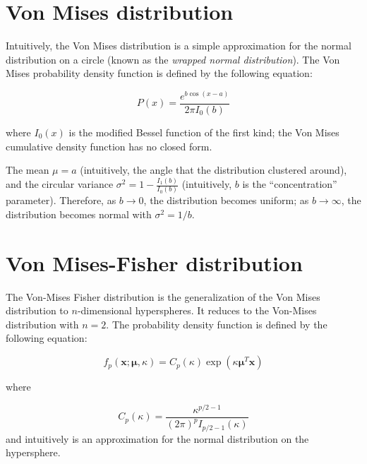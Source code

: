 \documentclass[../tech_report_1.tex]{subfiles}
\begin{document}
\section*{Von Mises distribution}

Intuitively, the Von Mises distribution \cite{wolfram_von_mises} is
a simple approximation for the normal distribution on a circle (known
as the \textit{wrapped normal distribution}). The Von Mises probability
density function is defined by the following equation:

\[
P(x)=\frac{{e^{b\cos(x-a)}}}{2\pi I_{0}(b)}
\]


where $I_{0}(x)$ is the modified Bessel function of the first kind;
the Von Mises cumulative density function has no closed form.

The mean $\mu=a$ (intuitively, the angle that the distribution clustered
around), and the circular variance $\sigma^{2}=1-\frac{{I_{1}(b)}}{I_{0}(b)}$
(intuitively, $b$ is the ``concentration'' parameter). Therefore,
as $b\rightarrow0$, the distribution becomes uniform; as $b\rightarrow\infty$,
the distribution becomes normal with $\sigma^{2}=1/b$.


\section*{Von Mises-Fisher distribution}

The Von-Mises Fisher distribution is the generalization of the Von
Mises distribution to $n$-dimensional hyperspheres. It reduces to
the Von-Mises distribution with $n=2$. The probability density function
is defined by the following equation:

\[
f_{p}(\boldsymbol{x};\boldsymbol{\mu},\kappa)=C_{p}(\kappa)\exp(\kappa\boldsymbol{\mu}^{T}\boldsymbol{x})
\]


where

\[
C_{p}(\kappa)=\frac{\kappa^{p/2-1}}{(2\pi)^{p}I_{p/2-1}(\kappa)}
\]
 and intuitively is an approximation for the normal distribution on
the hypersphere.
\end{document}
